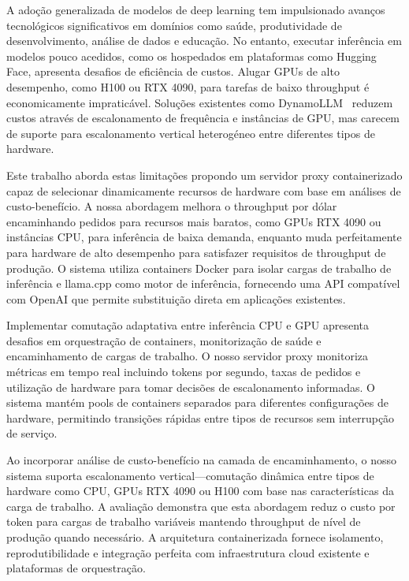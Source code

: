 \acresetall
\noindent A adoção generalizada de modelos de deep learning tem impulsionado avanços tecnológicos significativos em domínios como saúde, produtividade de desenvolvimento, análise de dados e educação. No entanto, executar inferência em modelos pouco acedidos, como os hospedados em plataformas como Hugging Face, apresenta desafios de eficiência de custos. Alugar GPUs de alto desempenho, como H100 ou RTX 4090, para tarefas de baixo throughput é economicamente impraticável. Soluções existentes como DynamoLLM~\cite{dynamollm} reduzem custos através de escalonamento de frequência e instâncias de GPU, mas carecem de suporte para escalonamento vertical heterogéneo entre diferentes tipos de hardware.

Este trabalho aborda estas limitações propondo um servidor proxy containerizado capaz de selecionar dinamicamente recursos de hardware com base em análises de custo-benefício. A nossa abordagem melhora o throughput por dólar encaminhando pedidos para recursos mais baratos, como GPUs RTX 4090 ou instâncias CPU, para inferência de baixa demanda, enquanto muda perfeitamente para hardware de alto desempenho para satisfazer requisitos de throughput de produção. O sistema utiliza containers Docker para isolar cargas de trabalho de inferência e llama.cpp como motor de inferência, fornecendo uma API compatível com OpenAI que permite substituição direta em aplicações existentes.

Implementar comutação adaptativa entre inferência CPU e GPU apresenta desafios em orquestração de containers, monitorização de saúde e encaminhamento de cargas de trabalho. O nosso servidor proxy monitoriza métricas em tempo real incluindo tokens por segundo, taxas de pedidos e utilização de hardware para tomar decisões de escalonamento informadas. O sistema mantém pools de containers separados para diferentes configurações de hardware, permitindo transições rápidas entre tipos de recursos sem interrupção de serviço.

Ao incorporar análise de custo-benefício na camada de encaminhamento, o nosso sistema suporta escalonamento vertical---comutação dinâmica entre tipos de hardware como CPU, GPUs RTX 4090 ou H100 com base nas características da carga de trabalho. A avaliação demonstra que esta abordagem reduz o custo por token para cargas de trabalho variáveis mantendo throughput de nível de produção quando necessário. A arquitetura containerizada fornece isolamento, reprodutibilidade e integração perfeita com infraestrutura cloud existente e plataformas de orquestração.